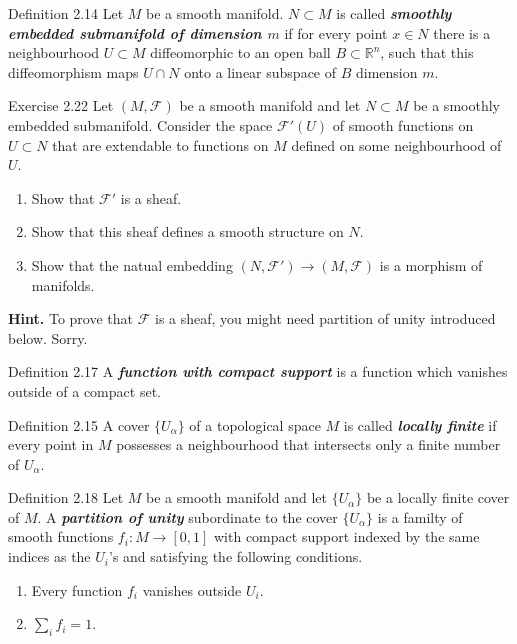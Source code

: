\begin{thing3}{Definition 2.14}\leavevmode
Let $M$ be a smooth manifold. $N \subset M$ is called \textit{\textbf{smoothly embedded submanifold of dimension $m$}} if for every point $x \in N$ there is a neighbourhood $U \subset M$ diffeomorphic to an open ball $B \subset \mathbb{R}^n$, such that this diffeomorphism maps $ U \cap N$ onto a linear subspace of $B$ dimension $m$.
\end{thing3}

\begin{thing4}{Exercise 2.22}\label{exer:2.22}\leavevmode
Let $(M,\mathcal{F})$ be a smooth manifold and let $N \subset M$ be a smoothly embedded submanifold. Consider the space $\mathcal{F}'(U)$ of smooth functions on $U \subset N$ that are extendable to functions on $M$ defined on some neighbourhood of $U$.
\begin{enumerate}[label=(\alph*)]
\item Show that $\mathcal{F}'$ is a sheaf.
\item  Show that this sheaf defines a smooth structure on $N$.
\item Show that the natual embedding $(N, \mathcal{F}') \to (M, \mathcal{F})$ is a morphism of manifolds.
\end{enumerate}
\textbf{Hint.} To prove that $\mathcal{F}$ is a sheaf, you might need partition of unity introduced below. Sorry.
\end{thing4}

\begin{thing3}{Definition 2.17}\label{def:2.17}\leavevmode
A \textit{\textbf{function with compact support}} is a function which vanishes outside of a compact set.
\end{thing3}

\begin{thing3}{Definition 2.15}\label{def:2.15}\leavevmode
A cover \(\{U_\alpha\}\) of a topological space \(M\) is called \textit{\textbf{locally finite}} if every point in \(M\) possesses a neighbourhood that intersects only a finite number of \(U_\alpha\).
\end{thing3}

\begin{thing3}{Definition 2.18}\label{def:2.18}\leavevmode
	Let \(M\) be a smooth manifold and let \(\{U_\alpha\}\) be a locally finite cover of \(M\). A \textit{\textbf{partition of unity}} subordinate to the cover \(\{U_\alpha\}\) is a familty of smooth functions \(f_i:M\to [0,1]\) with compact support indexed by the same indices as the \(U_i\)'s and satisfying the following conditions.
	\begin{enumerate}[label=(\alph*)]
	\item Every function \(f_i\) vanishes outside \(U_i\).
	\item \(\sum_i f_i=1\).
	\end{enumerate}
\end{thing3}


